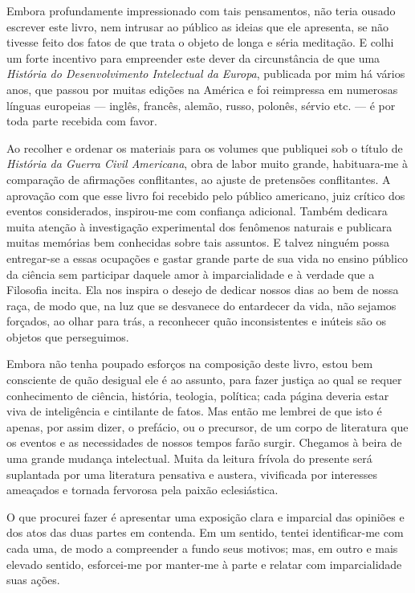 \documentclass[11pt,a5paper,twoside,openany]{book}
\begin{document}
Embora profundamente impressionado com tais pensamentos, não teria ousado escrever este livro, nem intrusar ao público as ideias que ele apresenta, se não tivesse feito dos fatos de que trata o objeto de longa e séria meditação. E colhi um forte incentivo para empreender este dever da circunstância de que uma \textit{História do Desenvolvimento Intelectual da Europa}, publicada por mim há vários anos, que passou por muitas edições na América e foi reimpressa em numerosas línguas europeias — inglês, francês, alemão, russo, polonês, sérvio etc. — é por toda parte recebida com favor.

Ao recolher e ordenar os materiais para os volumes que publiquei sob o título de \textit{História da Guerra Civil Americana}, obra de labor muito grande, habituara-me à comparação de afirmações conflitantes, ao ajuste de pretensões conflitantes. A aprovação com que esse livro foi recebido pelo público americano, juiz crítico dos eventos considerados, inspirou-me com confiança adicional. Também dedicara muita atenção à investigação experimental dos fenômenos naturais e publicara muitas memórias bem conhecidas sobre tais assuntos. E talvez ninguém possa entregar-se a essas ocupações e gastar grande parte de sua vida no ensino público da ciência sem participar daquele amor à imparcialidade e à verdade que a Filosofia incita. Ela nos inspira o desejo de dedicar nossos dias ao bem de nossa raça, de modo que, na luz que se desvanece do entardecer da vida, não sejamos forçados, ao olhar para trás, a reconhecer quão inconsistentes e inúteis são os objetos que perseguimos.

Embora não tenha poupado esforços na composição deste livro, estou bem consciente de quão desigual ele é ao assunto, para fazer justiça ao qual se requer conhecimento de ciência, história, teologia, política; cada página deveria estar viva de inteligência e cintilante de fatos. Mas então me lembrei de que isto é apenas, por assim dizer, o prefácio, ou o precursor, de um corpo de literatura que os eventos e as necessidades de nossos tempos farão surgir. Chegamos à beira de uma grande mudança intelectual. Muita da leitura frívola do presente será suplantada por uma literatura pensativa e austera, vivificada por interesses ameaçados e tornada fervorosa pela paixão eclesiástica.

O que procurei fazer é apresentar uma exposição clara e imparcial das opiniões e dos atos das duas partes em contenda. Em um sentido, tentei identificar-me com cada uma, de modo a compreender a fundo seus motivos; mas, em outro e mais elevado sentido, esforcei-me por manter-me à parte e relatar com imparcialidade suas ações.
\end{document}
